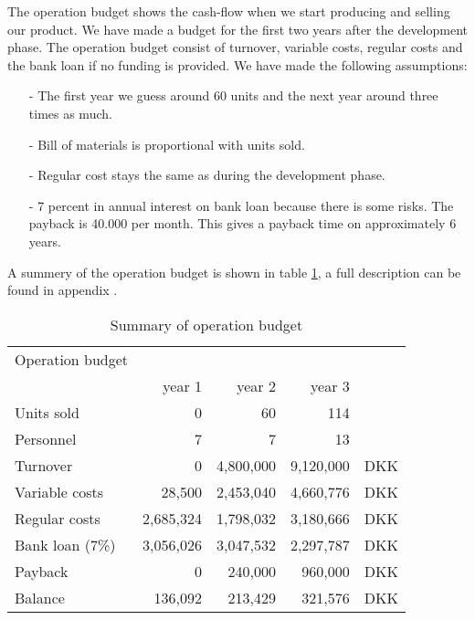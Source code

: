 

The operation budget shows the cash-flow when we start producing and selling our product. We have made a budget for the first two years after the development phase. The operation budget consist of turnover, variable costs, regular costs and the bank loan if no funding is provided. We have made the following assumptions:
\begin{itemize}
\item[-] The first year we guess around 60 units and the next year around three times as much.
\item[-] Bill of materials is proportional with units sold.
\item[-] Regular cost stays the same as during the development phase.
\item[-] 7 percent in annual interest on bank loan because there is some risks. The payback is 40.000 per month. This gives a payback time on approximately 6 years.
\end{itemize}
A summery of the operation budget is shown in table \ref{opebud}, a full description can be found in appendix .
\begin{table}[h!]
\centering
\begin{tabular}{l r r r r}
Operation budget      &            &              &             &    \\
                      & year 1     & year 2       & year 3      &    \\
\hline                                                               
Units sold            &          0 &        60   &         114  &    \\
Personnel             &          7 &         7   &          13  &    \\ 
\hline                                              
Turnover              &          0 & 4,800,000   &   9,120,000  & DKK\\
Variable costs        &     28,500 & 2,453,040   &   4,660,776  & DKK\\
Regular costs         &  2,685,324 & 1,798,032   &   3,180,666  & DKK\\
Bank loan (7\%)       &  3,056,026 & 3,047,532   &   2,297,787  & DKK\\
Payback               &          0 &   240,000   &     960,000  & DKK\\
Balance               &    136,092 &   213,429   &     321,576  & DKK\\  
\end{tabular}
\caption{Summary of operation budget}
\label{opebud}
\end{table}
